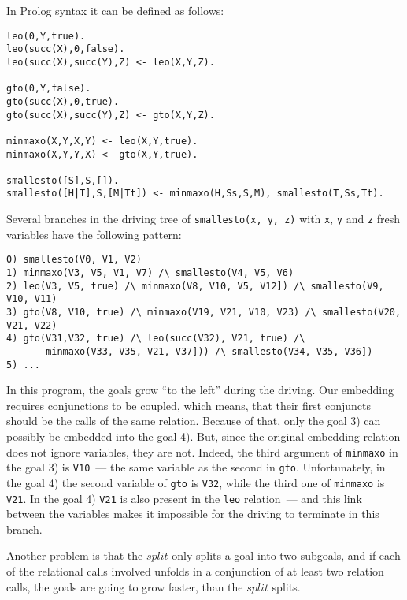 \documentclass{llncs}
\begin{document}
In Prolog syntax it can be defined as follows: 

\begin{verbatim}
leo(0,Y,true).
leo(succ(X),0,false).
leo(succ(X),succ(Y),Z) <- leo(X,Y,Z).

gto(0,Y,false).
gto(succ(X),0,true).
gto(succ(X),succ(Y),Z) <- gto(X,Y,Z).

minmaxo(X,Y,X,Y) <- leo(X,Y,true).
minmaxo(X,Y,Y,X) <- gto(X,Y,true).

smallesto([S],S,[]).
smallesto([H|T],S,[M|Tt]) <- minmaxo(H,Ss,S,M), smallesto(T,Ss,Tt).
\end{verbatim}

Several branches in the driving tree of \verb!smallesto(x, y, z)! with \verb!x!, \verb!y! and 
\verb!z! fresh variables have the following pattern: 

\begin{verbatim}
0) smallesto(V0, V1, V2)
1) minmaxo(V3, V5, V1, V7) /\ smallesto(V4, V5, V6)
2) leo(V3, V5, true) /\ minmaxo(V8, V10, V5, V12]) /\ smallesto(V9, V10, V11)
3) gto(V8, V10, true) /\ minmaxo(V19, V21, V10, V23) /\ smallesto(V20, V21, V22)
4) gto(V31,V32, true) /\ leo(succ(V32), V21, true) /\ 
       minmaxo(V33, V35, V21, V37])) /\ smallesto(V34, V35, V36])
5) ... 
\end{verbatim}

In this program, the goals grow ``to the left'' during the driving. Our embedding requires conjunctions to be coupled, which means, that their first conjuncts should be the calls of the same relation. Because of that, only the goal 3) can possibly be embedded into the goal 4). But, since the original embedding relation does not ignore variables, they are not. Indeed, the third argument of \verb!minmaxo! in the goal 3) is \verb!V10!~--- the same variable as the second in \verb!gto!. Unfortunately, in the goal 4) the second variable of \verb!gto! is \verb!V32!, while the third one of \verb!minmaxo! is \verb!V21!. In the goal 4) \verb!V21! is also present in the \verb!leo! relation~--- and this link between the variables makes it impossible for the driving to terminate in this branch.


Another problem is that the $split$ only splits a goal into two subgoals, and if each of the relational calls involved unfolds in a conjunction of at least two relation calls, the goals are going to grow faster, than the $split$ splits. 
\end{document}
